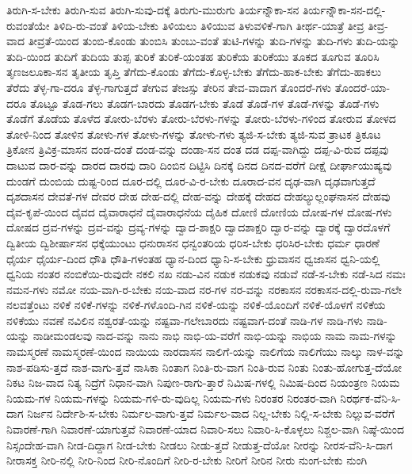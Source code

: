 {ತಿರುಗಿ-ಸ-ಬೇಕು
ತಿರುಗಿ-ಸುವ
ತಿರುಗಿ-ಸುವು-ದಕ್ಕೆ
ತಿರುಗು-ಮುರುಗು
ತಿರ್ಯನ್ನೌಕಾ-ಸನ
ತಿರ್ಯನ್ನೌಕಾ-ಸನ-ದಲ್ಲಿ-ರುವಂತೆಯೇ
ತಿಳಿದಿ-ರು-ವಂತೆ
ತಿಳಿಯ-ಬೇಕು
ತಿಳಿಯಲು
ತಿಳಿಯುವ
ತಿಳುವಳಿಕೆ-ಗಾಗಿ
ತೀರ್ಥ-ಯಾತ್ರೆ
ತೀವ್ರ
ತೀವ್ರ-ವಾದ
ತೀವ್ರತೆ-ಯಿಂದ
ತುಂಬಿ-ಕೊಂಡು
ತುಂಬಿಸಿ
ತುಂಬು-ವಂತೆ
ತುಟಿ-ಗಳನ್ನು
ತುದಿ-ಗಳನ್ನು
ತುದಿ-ಗಳು
ತುದಿ-ಯನ್ನು
ತುದಿ-ಯಿಂದ
ತುದಿಗೆ
ತುದಿಯ
ತುಪ್ಪ
ತುರಿಕೆ
ತುರಿಕೆ-ಯಂತಹ
ತುರಿಕೆಯ
ತುರಿಕೆಯು
ತೂಕದ
ತೂಗುವ
ತೂರಿಸಿ
ತೃಣಜಲೂಕಾ-ಸನ
ತೃತೀಯ
ತೃಪ್ತಿ
ತೆಗೆದು-ಕೊಂಡು
ತೆಗೆದು-ಕೊಳ್ಳ-ಬೇಕು
ತೆಗೆದು-ಹಾಕ-ಬೇಕು
ತೆಗೆದು-ಹಾಕಲು
ತೆರೆದು
ತೆಳ್ಳ-ಗಾ-ದರೂ
ತೆಳ್ಳ-ಗಾಗುತ್ತದೆ
ತೇಗುವ
ತೇಜಸ್ಸು
ತೇರಿನ
ತೇವ-ವಾದಾಗ
ತೊಂದರೆ-ಗಳು
ತೊಂದರೆ-ಯಾ-ದರೂ
ತೊಟ್ಟೂ
ತೊಡ-ಗಲು
ತೊಡಗ-ಬಾರದು
ತೊಡಗ-ಬೇಕು
ತೊಡೆ
ತೊಡೆ-ಗಳ
ತೊಡೆ-ಗಳನ್ನು
ತೊಡೆ-ಗಳು
ತೊಡೆಗೆ
ತೊಡೆಯ
ತೊಳೆದ
ತೋರು-ಬೆರಳು
ತೋರು-ಬೆರಳು-ಗಳನ್ನು
ತೋರು-ಬೆರಳು-ಗಳಿಂದ
ತೋರುವ
ತೋಳದ
ತೋಳಿ-ನಿಂದ
ತೋಳಿನ
ತೋಳು-ಗಳ
ತೋಳು-ಗಳನ್ನು
ತೋಳು-ಗಳು
ತ್ಯಜಿ-ಸ-ಬೇಕು
ತ್ಯಜಿ-ಸುವ
ತ್ರಾಟಕ
ತ್ರಿಕೂಟ
ತ್ರಿಕೋನ
ತ್ರಿವಿಕ್ರ-ಮಾಸನ
ದಂಡ-ದಂತೆ
ದಂಡ-ವನ್ನು
ದಂಡಾ-ಸನ
ದಂತ
ದಡ
ದಪ್ಪ-ವಾಗಿದ್ದು
ದಪ್ಪ-ವಿ-ರುವ
ದಪ್ಪವು
ದಾಟುವ
ದಾರ-ವನ್ನು
ದಾರದ
ದಾರವು
ದಾರಿ
ದಿಂಬಿನ
ದಿಟ್ಟಿಸಿ
ದಿನಕ್ಕೆ
ದಿನದ
ದಿನದ-ವರೆಗೆ
ದೀಕ್ಷೆ
ದೀರ್ಘಾಯುಷ್ಯವು
ದುಂಡಗೆ
ದುಂಬಿಯ
ದುಷ್ಟ-ರಿಂದ
ದೂರ-ದಲ್ಲಿ
ದೂರ-ವಿ-ರ-ಬೇಕು
ದೂರಾದ-ವನ
ದೃಢ-ವಾಗಿ
ದೃಢವಾಗುತ್ತದೆ
ದೃಶದಾಸನ
ದೇವತೆ-ಗಳ
ದೇವರ
ದೇಹ
ದೇಹ-ದಲ್ಲಿ
ದೇಹ-ವನ್ನು
ದೇಹಕ್ಕೆ
ದೇಹದ
ದೇಹಲ್ಯುಲ್ಲಂಘನಾಸನ
ದೇಹವು
ದೈವ-ಕೃಪೆ-ಯಿಂದ
ದೈವದ
ದೈವಾರಾಧನೆ
ದೈವಾರಾಧನೆಯ
ದೈಹಿಕ
ದೋಣಿ
ದೋಣಿಯ
ದೋಷ-ಗಳ
ದೋಷ-ಗಳು
ದೋಷದ
ದ್ರವ-ಗಳನ್ನು
ದ್ರವ-ವನ್ನು
ದ್ರವ್ಯ-ಗಳನ್ನು
ದ್ವಾದ-ಶಾಕ್ಷರಿ
ದ್ವಾದಶಾಕ್ಷರಿ
ದ್ವಾರ-ವನ್ನು
ದ್ವಾರಕ್ಕೆ
ದ್ವಾರದೊಳಗೆ
ದ್ವಿತೀಯ
ದ್ವಿಶೀರ್ಷಾಸನ
ಧಕ್ಕೆಯುಂಟು
ಧನುರಾಸನ
ಧನ್ವಂತರಿಯ
ಧರಿಸ-ಬೇಕು
ಧರಿಸಿರ-ಬೇಕು
ಧರ್ಮ
ಧಾರಣೆ
ಧೈರ್ಯ
ಧೈರ್ಯ-ದಿಂದ
ಧೌತಿ
ಧೌತಿ-ಗಳಂತಹ
ಧ್ಯಾನ-ದಿಂದ
ಧ್ಯಾನಿ-ಸ-ಬೇಕು
ಧ್ರುವಾಸನ
ಧ್ವಜಾಸನ
ಧ್ವನಿ-ಯಲ್ಲಿ
ಧ್ವನಿಯ
ನಂತರ
ನಂಬಿಕೆಯಿ-ರುವುದೇ
ನಕಲಿ
ನಖ
ನಡು-ವಿನ
ನಡುಕ
ನಡುಕವು
ನಡುವೆ
ನಡೆ-ಸ-ಬೇಕು
ನಡೆ-ಸಿದ
ನಮಃ
ನಮನ-ಗಳು
ನಮೋ
ನಯ-ವಾಗಿ-ರ-ಬೇಕು
ನಯ-ವಾದ
ನರ-ಗಳ
ನರ-ವನ್ನು
ನರಕಾಸನ
ನರಕಾಸನ-ದಲ್ಲಿ-ರುವಾ-ಗಲೇ
ನಲವತ್ತೆಂಟು
ನಳಿಕೆ
ನಳಿಕೆ-ಗಳನ್ನು
ನಳಿಕೆ-ಗಳೊಂದಿ-ಗಿನ
ನಳಿಕೆ-ಯನ್ನು
ನಳಿಕೆ-ಯೊಂದಿಗೆ
ನಳಿಕೆ-ಯೊಳಗೆ
ನಳಿಕೆಯ
ನಳಿಕೆಯು
ನವಣೆ
ನವಿಲಿನ
ನಶ್ವರತೆ-ಯನ್ನು
ನಷ್ಟವಾ-ಗಲೇಬಾರದು
ನಷ್ಟವಾಗ-ದಂತೆ
ನಾಡಿ-ಗಳ
ನಾಡಿ-ಗಳು
ನಾಡಿ-ಯನ್ನು
ನಾಡೀಮಂಡಲವು
ನಾದ-ವನ್ನು
ನಾನು
ನಾಭಿ
ನಾಭಿ-ಯ-ವರೆಗೆ
ನಾಭಿ-ಯನ್ನು
ನಾಭಿಯ
ನಾಮ
ನಾಮ-ಗಳನ್ನು
ನಾಮಸ್ಮರಣೆ
ನಾಮಸ್ಮರಣೆ-ಯಿಂದ
ನಾಯಿಯ
ನಾರದಾಸನ
ನಾಲಿಗೆ-ಯನ್ನು
ನಾಲಿಗೆಯ
ನಾಲಿಗೆಯು
ನಾಲ್ಕು
ನಾಳ-ವನ್ನು
ನಾಶ-ಪಡಿಸು-ತ್ತದೆ
ನಾಶ-ವಾಗು-ತ್ತವೆ
ನಾಸಿಕಾ
ನಿಂತಾಗ
ನಿಂತಿ-ರು-ವಾಗ
ನಿಂತಿ-ರುವ
ನಿಂತು
ನಿಂತು-ಹೋಗುತ್ತ-ದೆಯೋ
ನಿಕಟ
ನಿಜ-ವಾದ
ನಿತ್ಯ
ನಿದ್ರೆಗೆ
ನಿಧಾನ-ವಾಗಿ
ನಿಪುಣ-ರಾಗು-ತ್ತಾರೆ
ನಿಮಿಷ-ಗಳಲ್ಲಿ
ನಿಮಿಷ-ದಿಂದ
ನಿಯಂತ್ರಣ
ನಿಯಮ
ನಿಯಮ-ಗಳ
ನಿಯಮ-ಗಳನ್ನು
ನಿಯಮ-ಗಳಿ-ರು-ವುದಿಲ್ಲ
ನಿಯಮ-ಗಳು
ನಿರಂತರ
ನಿರಂತರ-ವಾಗಿ
ನಿರರ್ಥಕ-ವೆನಿ-ಸಿ-ದಾಗ
ನಿರ್ಜನ
ನಿರ್ದೇಶಿ-ಸ-ಬೇಕು
ನಿರ್ಮಲ-ವಾಗು-ತ್ತವೆ
ನಿರ್ಮಲ-ವಾದ
ನಿಲ್ಲ-ಬೇಕು
ನಿಲ್ಲಿ-ಸ-ಬೇಕು
ನಿಲ್ಲುವ-ವರೆಗೆ
ನಿವಾರಣೆ-ಗಾಗಿ
ನಿವಾರಣೆ-ಯಾಗುತ್ತವೆ
ನಿವಾರಣೆ-ಯಾದ
ನಿವಾರಿ-ಸಲು
ನಿವಾರಿ-ಸಿ-ಕೊಳ್ಳಲು
ನಿಶ್ಚಲ-ವಾಗಿ
ನಿಷ್ಠೆ-ಯಿಂದ
ನಿಸ್ಸಂದೇಹ-ವಾಗಿ
ನೀಡ-ದಿದ್ದಾಗ
ನೀಡ-ಬೇಕು
ನೀಡಲು
ನೀಡು-ತ್ತದೆ
ನೀಡುತ್ತ-ದೆಯೋ
ನೀರನ್ನು
ನೀರಸ-ವೆನಿ-ಸಿ-ದಾಗ
ನೀರಾಸಕ್ತ
ನೀರಿ-ನಲ್ಲಿ
ನೀರಿ-ನಿಂದ
ನೀರಿ-ನೊಂದಿಗೆ
ನೀರಿ-ರ-ಬೇಕು
ನೀರಿಗೆ
ನೀರಿನ
ನೀರು
ನುಂಗ-ಬೇಕು
ನುಂಗಿ
}
